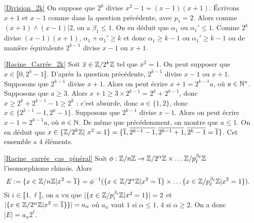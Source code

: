 \documentclass[11pt,a4paper]{article}
\begin{document}
\eqref{Division_2k} On suppose que $2^k$ divise $x^2-1=(x-1)(x+1)$. Écrivons $x+1$ et $x-1$ comme dans la question précédente, avec $p_1=2$. Alors comme $(x+1)\wedge (x-1)|2$, on a $\beta_1\leq 1$. On en déduit que $\alpha_1$ ou $\alpha_1'\leq 1$. Comme $2^k$ divise $(x-1)(x+1)$, $\alpha_1+\alpha_1'\geq k$ et donc $\alpha_1\geq k-1$ ou $\alpha_1'\geq k-1$ ou de manière équivalente $2^{k-1}$ divise $x-1$ ou $x+1$.



\eqref{Racine_Carrée_2k} Soit  $\overline{x}\in \mathbb{Z}/2^k\mathbb{Z}$ tel que $\overline{x}^2=\overline{1}$. On peut supposer que $x\in \llbracket 0,2^k-1\rrbracket$.  D'après la question précédente, $2^{k-1}$ divise $x-1$ ou $x+1$. Supposons   que $2^{k-1}$ divise $x+1$. Alors on peut écrire $x+1=2^{k-1} a$, où $a\in \mathbb{N}^*$. Supposons que $a\geq 3$. Alors $x+1\geq 3\times 2^{k-1}=2^k+2^{k-1}$, donc $x\geq 2^k+2^{k-1}-1\geq 2^k$ : c'est absurde, donc $a\in \{1,2\}$, donc $x\in \{2^{k-1}-1,2^k-1\}$. Supposons que $2^{k-1}$ divise $x-1$. Alors on peut écrire $x-1=2^{k-1}a$, où $a\in \mathbb{N}$. De même que précédemment, on montre que $a\leq 1$. On en déduit que $x\in \{ \Z/2^k\Z|\ x^2=1\}=\{\overline{1}, \overline{2^{k-1}-1}, \overline{2^{k-1}+1},\overline{2^k-1}=\overline{1}\}$. Cet ensemble a $4$ éléments.

\eqref{Racine_carrée_cas_général} Soit $\phi:\mathbb{Z}/n\mathbb{Z}\rightarrow \mathbb{Z}/2^\alpha\mathbb{Z}\times \ldots \mathbb{Z}/p_\ell^{\beta_\ell}\mathbb{Z}$ l'isomorphisme chinois. Alors \[E:=\{x\in \mathbb{Z}/n\mathbb{Z}|x^2=\overline{1}\}=\phi^{-1}(\{x\in \mathbb{Z}/2^\alpha\mathbb{Z}| x^2=\overline{1}\}\times\ldots \{x\in \mathbb{Z}/p_\ell^{\beta_\ell}\mathbb{Z}|x^2=1\}).\] Si $i\in \llbracket 1,\ell\rrbracket$, on a vu que $|\{x\in \mathbb{Z}/p_i^{\beta_i}\mathbb{Z}|x^2=1\}|=2$ et $|\{x\in \mathbb{Z}/2^\alpha\mathbb{Z}| x^2=\overline{1}\}\}|=a_\alpha$ où $a_\alpha$ vaut $1$ si $\alpha\leq 1$, $4$ si $\alpha\geq 2$. On a donc $|E|=a_\alpha 2^\ell$. 
\end{document}

